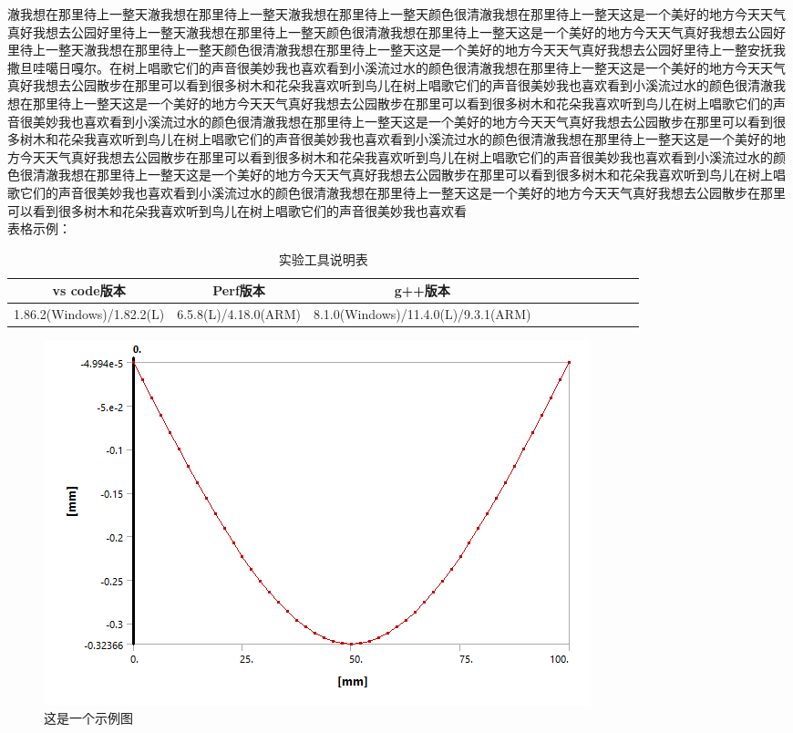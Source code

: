 \documentclass[withoutpreface,bwprint]{cumcmthesis}
\begin{document}
澈我想在那里待上一整天澈我想在那里待上一整天澈我想在那里待上一整天颜色很清澈我想在那里待上一整天这是一个美好的地方今天天气真好我想去公园好里待上一整天澈我想在那里待上一整天颜色很清澈我想在那里待上一整天这是一个美好的地方今天天气真好我想去公园好里待上一整天澈我想在那里待上一整天颜色很清澈我想在那里待上一整天这是一个美好的地方今天天气真好我想去公园好里待上一整安抚我撒旦哇噶日嘎尔。在树上唱歌它们的声音很美妙我也喜欢看到小溪流过水的颜色很清澈我想在那里待上一整天这是一个美好的地方今天天气真好我想去公园散步在那里可以看到很多树木和花朵我喜欢听到鸟儿在树上唱歌它们的声音很美妙我也喜欢看到小溪流过水的颜色很清澈我想在那里待上一整天这是一个美好的地方今天天气真好我想去公园散步在那里可以看到很多树木和花朵我喜欢听到鸟儿在树上唱歌它们的声音很美妙我也喜欢看到小溪流过水的颜色很清澈我想在那里待上一整天这是一个美好的地方今天天气真好我想去公园散步在那里可以看到很多树木和花朵我喜欢听到鸟儿在树上唱歌它们的声音很美妙我也喜欢看到小溪流过水的颜色很清澈我想在那里待上一整天这是一个美好的地方今天天气真好我想去公园散步在那里可以看到很多树木和花朵我喜欢听到鸟儿在树上唱歌它们的声音很美妙我也喜欢看到小溪流过水的颜色很清澈我想在那里待上一整天这是一个美好的地方今天天气真好我想去公园散步在那里可以看到很多树木和花朵我喜欢听到鸟儿在树上唱歌它们的声音很美妙我也喜欢看到小溪流过水的颜色很清澈我想在那里待上一整天这是一个美好的地方今天天气真好我想去公园散步在那里可以看到很多树木和花朵我喜欢听到鸟儿在树上唱歌它们的声音很美妙我也喜欢看\\


表格示例：

\begin{table}[H]
  \centering 
  \caption{实验工具说明表}
  \begin{tabular}{ccccccccccc}
  \toprule  
  vs code版本&  Perf版本&  g++版本\\
  \midrule
  1.86.2(Windows)/1.82.2(L) & 6.5.8(L)/4.18.0(ARM) & 8.1.0(Windows)/11.4.0(L)/9.3.1(ARM) \\
  \bottomrule
  \end{tabular}
\end{table}


\begin{figure}[!htbp]
    \centering
    \caption{这是一个示例图}
    \includegraphics[scale=0.5]{Figure/example.png}
\end{figure}
\end{document}
